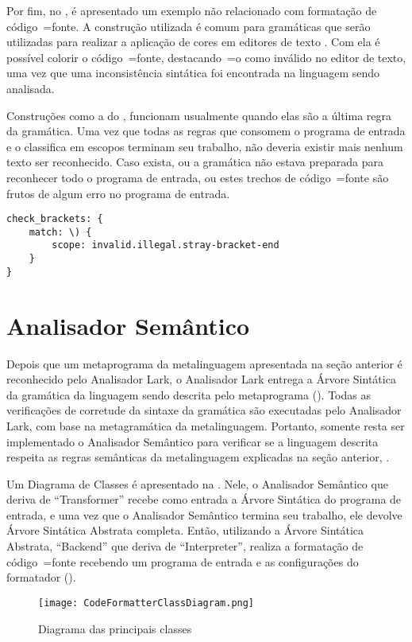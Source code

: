 Por fim,
no ,
é apresentado um exemplo não relacionado com formatação de código~=fonte.
A construção utilizada é comum para gramáticas que serão utilizadas para realizar a aplicação de cores em editores de texto \cite{vsCodeSyntaxHighlighthing}.
Com ela é possível colorir o código~=fonte,
destacando~=o como inválido no editor de texto,
uma vez que uma inconsistência sintática foi encontrada na linguagem sendo analisada.

Construções como a do ,
funcionam usualmente quando elas são a última regra da gramática.
Uma vez que todas as regras que consomem o programa de entrada e
o classifica em escopos terminam seu trabalho,
não deveria existir mais nenhum texto ser reconhecido.
Caso exista,
ou a gramática não estava preparada para reconhecer todo o programa de entrada,
ou estes trechos de código~=fonte são frutos de algum erro no programa de entrada.
\begin{lstlisting}[caption={Exemplo de Gramática, Reconhecimento de Erros},label={exemploDeGramaticaPawn5},style=yaml_style]
check_brackets: {
    match: \) {
        scope: invalid.illegal.stray-bracket-end
    }
}
\end{lstlisting}


\section{Analisador Semântico}
\label{section:AnalisadorSemantico}

Depois que um metaprograma da metalinguagem apresentada na seção anterior é reconhecido pelo Analisador Lark,
o Analisador Lark entrega a Árvore Sintática da gramática da linguagem sendo descrita pelo metaprograma ().
Todas as verificações de corretude da sintaxe da gramática são executadas pelo Analisador Lark,
com base na metagramática da metalinguagem.
Portanto,
somente resta ser implementado o Analisador Semântico para verificar se a linguagem descrita respeita as regras semânticas da metalinguagem explicadas na seção anterior,
.

Um Diagrama de Classes é apresentado na .
Nele,
o Analisador Semântico que deriva de ``Transformer'' recebe como entrada a Árvore Sintática do programa de entrada,
e uma vez que o Analisador Semântico termina seu trabalho,
ele devolve Árvore Sintática Abstrata completa.
Então,
utilizando a Árvore Sintática Abstrata,
``Backend'' que deriva de ``Interpreter'',
realiza a formatação de código~=fonte recebendo um programa de entrada e
as configurações do formatador ().
\begin{figure}[!htb]
\caption{Diagrama das principais classes}
\label{CodeFormatterClassDiagram}
\centering
\texttt{[image: CodeFormatterClassDiagram.png]}
\end{figure}

